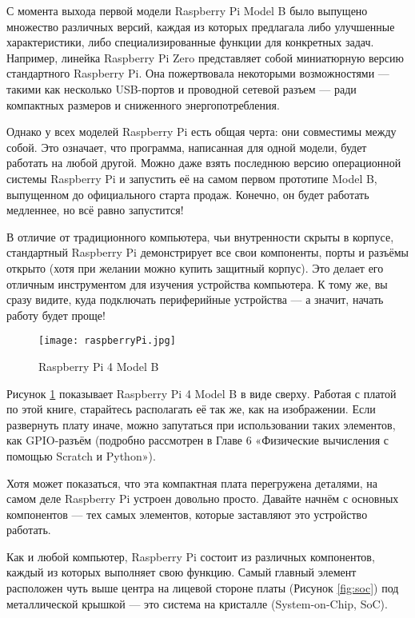 С момента выхода первой модели Raspberry Pi Model B было выпущено множество различных версий, каждая из которых предлагала либо улучшенные характеристики, либо специализированные функции для конкретных задач. Например, линейка Raspberry Pi Zero представляет собой миниатюрную версию стандартного Raspberry Pi. Она пожертвовала некоторыми возможностями — такими как несколько USB-портов и проводной сетевой разъем — ради компактных размеров и сниженного энергопотребления.

Однако у всех моделей Raspberry Pi есть общая черта: они совместимы между собой. Это означает, что программа, написанная для одной модели, будет работать на любой другой.
Можно даже взять последнюю версию операционной системы Raspberry Pi и запустить её на самом первом прототипе Model B, выпущенном до официального старта продаж. Конечно, он будет работать медленнее, но всё равно запустится!

В отличие от традиционного компьютера, чьи внутренности скрыты в корпусе, стандартный Raspberry Pi демонстрирует все свои компоненты, порты и разъёмы открыто (хотя при желании можно купить защитный корпус). Это делает его отличным инструментом для изучения устройства компьютера. К тому же, вы сразу видите, куда подключать периферийные устройства — а значит, начать работу будет проще!

\begin{figure}[H]
	\centering
	\texttt{[image: raspberryPi.jpg]}
	\caption{Raspberry Pi 4 Model B}
	\label{fig:raspberry4B}
\end{figure}

Рисунок \ref{fig:raspberry4B} показывает Raspberry Pi 4 Model B в виде сверху. Работая с платой по этой книге, старайтесь располагать её так же, как на изображении. Если развернуть плату иначе, можно запутаться при использовании таких элементов, как GPIO-разъём (подробно рассмотрен в Главе 6 «Физические вычисления с помощью Scratch и Python»).

Хотя может показаться, что эта компактная плата перегружена деталями, на самом деле Raspberry Pi устроен довольно просто. Давайте начнём с основных компонентов — тех самых элементов, которые заставляют это устройство работать.


Как и любой компьютер, Raspberry Pi состоит из различных компонентов, каждый из которых выполняет свою функцию. Самый главный элемент расположен чуть выше центра на лицевой стороне платы (Рисунок \ref{fig:soc}) под металлической крышкой — это система на кристалле (System-on-Chip, SoC).

